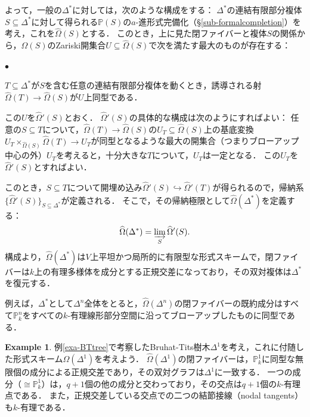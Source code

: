 \documentclass[a4paper,12pt, dvipdfmx]{jsbook}
\def\P{\mathbb{P}}
\renewenvironment{itemize}%
{%
   \begin{list}{\parbox{1zw}{$\bullet$}}%
   {%
      \setlength{\topsep}{.5zh}
      \setlength{\itemindent}{0zw}
      \setlength{\leftmargin}{3zw}%
      \setlength{\rightmargin}{0zw}%
      \setlength{\labelsep}{.5zw}%
      \setlength{\labelwidth}{3zw}%
      \setlength{\itemsep}{0.2em}%
      \setlength{\parsep}{0em}%
      \setlength{\listparindent}{0zw}%
   }
}{%
   \end{list}%
}
\theoremstyle{plain}
\theoremstyle{definition}
\newtheorem{exa}[thm]{\bfseries Example}
\begin{document}
よって，一般の$\Delta^{\ast}$に対しては，次のような構成をする：
$\Delta^{\ast}$の連結有限部分複体$S\subseteq\Delta^{\ast}$に対して得られる$\P(S)$の$a$-進形式完備化（\S\ref{sub-formalcompletion}）を考え，これを$\widehat{\Omega}(S)$とする．
このとき，上に見た閉ファイバーと複体$S$の関係から，$\widehat{\Omega}(S)$のZariski開集合$U\subseteq\widehat{\Omega}(S)$で次を満たす最大のものが存在する：
\begin{itemize}
\item $T\subseteq\Delta^{\ast}$が$S$を含む任意の連結有限部分複体を動くとき，誘導される射$\widehat{\Omega}(T)\rightarrow\widehat{\Omega}(S)$が$U$上同型である．
\end{itemize}
この$U$を$\widehat{\Omega}'(S)$とおく．
$\widehat{\Omega}'(S)$の具体的な構成は次のようにすればよい：
任意の$S\subseteq T$について，$\widehat{\Omega}(T)\rightarrow\widehat{\Omega}(S)$の$U_T\subseteq\widehat{\Omega}(S)$上の基底変換$U_T\times_{\widehat{\Omega}(S)}\widehat{\Omega}(T)\rightarrow U_T$が同型となるような最大の開集合（つまりブローアップ中心の外）$U_T$を考えると，十分大きな$T$について，$U_T$は一定となる．
この$U_T$を$\widehat{\Omega}'(S)$とすればよい．

このとき，$S\subseteq T$について開埋め込み$\widehat{\Omega}'(S)\hookrightarrow\widehat{\Omega}'(T)$が得られるので，帰納系$\{\widehat{\Omega}'(S)\}_{S\subseteq\Delta^{\ast}}$が定義される．
そこで，その帰納極限として$\widehat{\Omega}(\Delta^{\ast})$を定義する：
$$
\widehat{\Omega}(\Delta^{\ast})=\varinjlim_S\widehat{\Omega}'(S).
$$
構成より，$\widehat{\Omega}(\Delta^{\ast})$は$V$上平坦かつ局所的に有限型な形式スキームで，閉ファイバーは$k$上の有理多様体を成分とする正規交差になっており，その双対複体は$\Delta^{\ast}$を復元する．

例えば，$\Delta^{\ast}$として$\Delta^n$全体をとると，$\widehat{\Omega}(\Delta^n)$の閉ファイバーの既約成分はすべて$\P^n_k$をすべての$k$-有理線形部分空間に沿ってブローアップしたものに同型である．
\begin{exa}\label{exa-BTtreeformalscheme}{\rm
例\ref{exa-BTtree}で考察したBruhat-Tits樹木$\Delta^1$を考え，これに付随した形式スキーム$\widehat{\Omega}(\Delta^1)$を考えよう．
$\widehat{\Omega}(\Delta^1)$の閉ファイバーは，$\P^1_k$に同型な無限個の成分による正規交差であり，その双対グラフは$\Delta^1$に一致する．
一つの成分（$\cong\P^1_k$）は，$q+1$個の他の成分と交わっており，その交点は$q+1$個の$k$-有理点である．
また，正規交差している交点での二つの結節接線（nodal tangents）も$k$-有理である．}
\end{exa}
\end{document}
